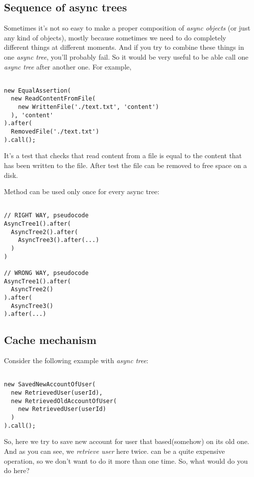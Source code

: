 \documentclass{article}
\newcommand{\cit}[1]{{\fontfamily{qcr}\selectfont{\textit{\textbf{\textcolor{darkgray}{#1}}}}}}
\begin{document}
\subsection{Sequence of async trees}

Sometimes it's not so easy to make a proper composition of \textit{async objects} (or just any kind of objects), mostly because sometimes we need to do completely different things at different moments. And if you try to combine these things in one \textit{async tree}, you'll probably fail. So it would be very useful to be able call one \textit{async tree} after another one. For example,

\begin{lstlisting}

new EqualAssertion(
  new ReadContentFromFile(
    new WrittenFile('./text.txt', 'content')
  ), 'content'
).after(
  RemovedFile('./text.txt')
).call();

\end{lstlisting}

It's a test that checks that read content from a file is equal to the content that has been written to the file. After test the file can be removed to free space on a disk.

Method \cit{after} can be used only once for every async tree:

\begin{lstlisting}

// RIGHT WAY, pseudocode
AsyncTree1().after(
  AsyncTree2().after(
    AsyncTree3().after(...)
  )
)

// WRONG WAY, pseudocode
AsyncTree1().after(
  AsyncTree2()
).after(
  AsyncTree3()
).after(...)

\end{lstlisting}

\subsection{Cache mechanism}

Consider the following example with  \textit{async tree}:

\begin{lstlisting}

new SavedNewAccountOfUser(
  new RetrievedUser(userId),
  new RetrievedOldAccountOfUser(
    new RetrievedUser(userId)
  )
).call();

\end{lstlisting}

So, here we try to save new account for user that based(somehow) on its old one. And as you can see, we \textit{retrieve user} here twice. \cit{RetrievedUser} can be a quite expensive operation, so we don't want to do it more than one time. So, what would do you do here?
\end{document}
